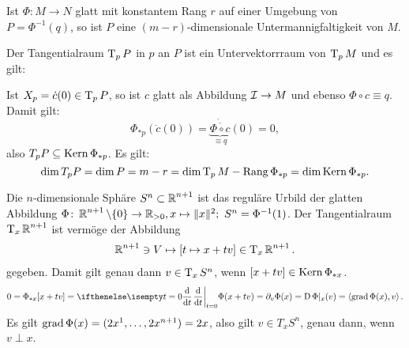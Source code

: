 \begin{bem}
  Ist $\Phi \colon M \to N$ glatt mit konstantem Rang $r$ auf einer Umgebung von $P = \Phi^{-1}(q)$, so ist $P$ eine $(m-r)$-dimensionale Untermannigfaltigkeit von $M$.
  
  Der Tangentialraum $\operatorname{T}_pP$ in $p$ an $P$ ist ein Untervektorrraum von $\operatorname{T}_pM$ und es gilt:
  \begin{center}\end{center}

  Ist $X_p = \dot c(0) \in \operatorname{T}_pP$, so ist $c$ glatt als Abbildung $\operatorname{\mathcal{I}} \to M$ und ebenso $\Phi \circ c \equiv q$.
  Damit gilt:
    \[ \Phi_{*p}(\dot c(0)) = \dot{\underbrace{\overline{\Phi \circ c}}_{\equiv q}}(0) = 0, \]
  also $T_pP \subseteq \operatorname{Kern} \Phi_{*p}$. Es gilt:
   \[ \dim T_pP = \dim P = m-r = \dim \operatorname{T}_pM - \operatorname{Rang} \Phi_{*p} = \dim \operatorname{Kern} \Phi_{*p}. \]
\end{bem}

\begin{Bsp}
  Die $n$-dimensionale Sphäre $S^n \subset \operatorname{\mathbb{R}}^{n+1}$ ist das reguläre Urbild der glatten Abbildung $\Phi \colon \operatorname{\mathbb{R}}^{n+1}\setminus \{0\} \to \operatorname{\mathbb{R}}_{> 0}, x \mapsto \|x\|^2; \ S^n = \Phi^{-1}(1)$. Der Tangentialraum $\operatorname{T}_x\operatorname{\mathbb{R}}^{n+1}$ ist vermöge der Abbildung
\begin{align*}
  \operatorname{\mathbb{R}}^{n+1} \ni V \mapsto [t \mapsto x + tv] \in \operatorname{T}_x\operatorname{\mathbb{R}}^{n+1}.
\end{align*}
gegeben. Damit gilt genau dann $v \in \operatorname{T}_xS^n$, wenn $[x+tv] \in \operatorname{Kern} \Phi_{*x}$.
\begin{align*}
  0 = \Phi_{*x}[x+tv] = \difffrac[t=0]{}{t} \Phi(x+tv) = \partial_v \Phi(x) = \D \Phi|_x(v) = \left<\grad\Phi(x),v\right>.
\end{align*}
Es gilt $\operatorname{grad} \Phi(x) = (2x^1, \ldots, 2x^{n+1}) = 2x$, also gilt $v \in T_xS^n$, genau dann, wenn $v \perp x$.
\end{Bsp}


